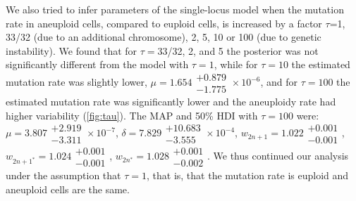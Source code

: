 \documentclass[12pt]{extarticle}
\begin{document}
We also tried to infer parameters of the single-locus model when the mutation rate in aneuploid cells, compared to euploid cells, is increased by a factor $\tau$=1, 33/32 (due to an additional chromosome), 2, 5, 10 or 100 (due to genetic instability).
We found that for $\tau=$33/32, 2, and 5 the posterior was not significantly different from the model with $\tau=1$, while for $\tau=10$ the estimated mutation rate was slightly lower, $\mu=1.654\substack{+0.879 \\ -1.775}\times10^{-6}$, and for $\tau=100$ the estimated mutation rate was significantly lower and the aneuploidy rate had higher variability (\autoref{fig:tau}). The MAP and 50\% HDI with $\tau=100$ were: 
$\mu=3.807\substack{+2.919 \\ -3.311}\times10^{-7}$,
$\delta=7.829\substack{+10.683 \\ -3.555}\times10^{-4}$,
$w_{2n+1}=1.022\substack{+0.001 \\ -0.001}$,
$w_{2n+1^*}=1.024\substack{+0.001 \\ -0.001}$,
$w_{2n^*}=1.028\substack{+0.001 \\ -0.002}$.
We thus continued our analysis under the assumption that $\tau=1$, that is, that the mutation rate is euploid and aneuploid cells are the same.
\end{document}
